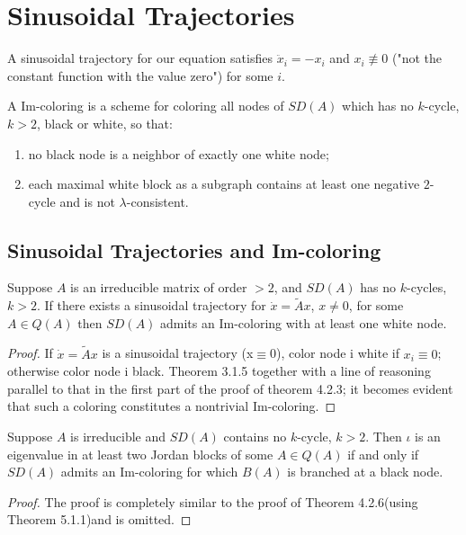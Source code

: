 \chapter{Sinusoidal Trajectories}
\begin{dfn}
	A sinusoidal trajectory for our equation satisfies $\ddot{x}_i = -x_i$ and $x_i \not\equiv 0$ ("not the constant function with the value zero") for some $i$.
\end{dfn}
\begin{dfn}
	A Im-coloring is a scheme for coloring all nodes of $SD(A)$ which has no $k$-cycle, $k > 2$, black or white, so that:
	\begin{enumerate}
		\item no black node is a neighbor of exactly one white node;
		\item each maximal white block as a subgraph contains at least one negative $2$-cycle and is not $\lambda$-consistent.
	\end{enumerate}
\end{dfn}
\section{Sinusoidal Trajectories and Im-coloring}
\begin{thm}
		Suppose $A$ is an irreducible matrix of order $> 2$, and $SD(A)$ has no $k$-cycles, $k > 2$. If there exists a sinusoidal trajectory for $\dot{x} = \tilde{A}x$, $x \neq 0$, for some $A \in Q(A)$ then $SD(A)$ admits an Im-coloring with at least one white node.
\end{thm}
\begin{proof}
	If  $\dot{x} = \tilde{A}x$ is a sinusoidal trajectory (x$\equiv$0), color node i white if $x_{i}\equiv0$; otherwise color node i black. Theorem 3.1.5 together with a line of reasoning parallel to that in the first part of the proof of theorem 4.2.3; it becomes evident that such a coloring constitutes a nontrivial Im-coloring. 
\end{proof}
\begin{thm}
	Suppose $A$ is irreducible and $SD(A)$ contains no $k$-cycle, $k > 2$. Then $\iota$ is an eigenvalue in at least two Jordan blocks of some $A \in Q(A)$ if and only if $SD(A)$ admits an Im-coloring for which $B(A)$ is branched at a black node.
\end{thm}
\begin{proof}
	The proof is completely similar to the proof of Theorem 4.2.6(using Theorem 5.1.1)and is omitted.
\end{proof}